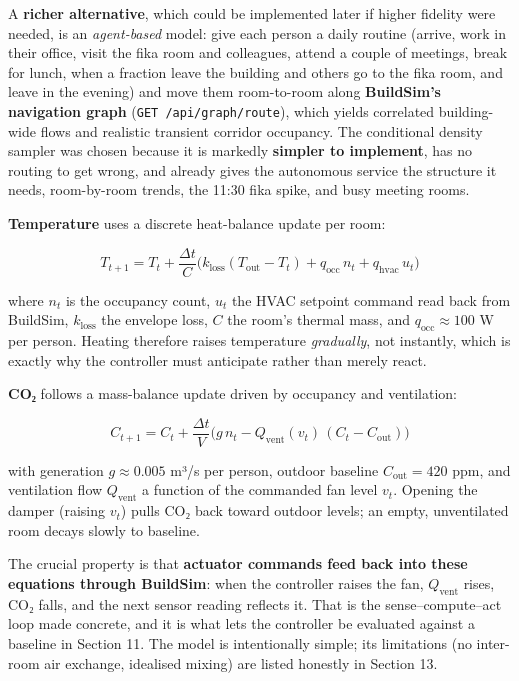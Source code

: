 \documentclass[
  11pt,
]{article}
\begin{document}
A \textbf{richer alternative}, which could be implemented later if higher
fidelity were needed, is an \emph{agent-based} model: give each person a
daily routine (arrive, work in their office, visit the fika room and
colleagues, attend a couple of meetings, break for lunch, when a
fraction leave the building and others go to the fika room, and leave
in the evening) and move them room-to-room along \textbf{BuildSim's
navigation graph} (\texttt{GET\ /api/graph/route}), which yields
correlated building-wide flows and realistic transient corridor
occupancy. The conditional density sampler was chosen because it is
markedly \textbf{simpler to implement}, has no routing to get wrong, and
already gives the autonomous service the structure it needs, room-by-room
trends, the 11:30 fika spike, and busy meeting rooms.

\textbf{Temperature} uses a discrete heat-balance update per room:

\[T_{t+1} = T_t + \frac{\Delta t}{C}\big(k_\text{loss}(T_\text{out}-T_t) + q_\text{occ}\,n_t + q_\text{hvac}\,u_t\big)\]

where \(n_t\) is the occupancy count, \(u_t\) the HVAC setpoint command
read back from BuildSim, \(k_\text{loss}\) the envelope loss, \(C\) the
room's thermal mass, and \(q_\text{occ}\approx 100\) W per person.
Heating therefore raises temperature \emph{gradually}, not instantly, which is exactly why the controller must anticipate rather than merely
react.

\textbf{CO₂} follows a mass-balance update driven by occupancy and
ventilation:

\[C_{t+1} = C_t + \frac{\Delta t}{V}\big(g\,n_t - Q_\text{vent}(v_t)\,(C_t - C_\text{out})\big)\]

with generation \(g \approx 0.005\) m³/s per person, outdoor baseline
\(C_\text{out}=420\) ppm, and ventilation flow \(Q_\text{vent}\) a
function of the commanded fan level \(v_t\). Opening the damper (raising
\(v_t\)) pulls CO₂ back toward outdoor levels; an empty, unventilated
room decays slowly to baseline.

The crucial property is that \textbf{actuator commands feed back into
these equations through BuildSim}: when the controller raises the fan,
\(Q_\text{vent}\) rises, CO₂ falls, and the next sensor reading reflects
it. That is the sense--compute--act loop made concrete, and it is what
lets the controller be evaluated against a baseline in Section 11. The
model is intentionally simple; its limitations (no inter-room air
exchange, idealised mixing) are listed honestly in Section 13.
\end{document}
